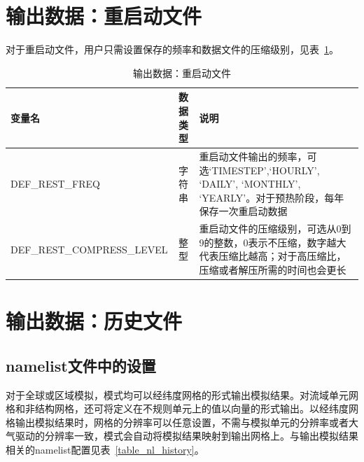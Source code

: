 \documentclass[a4paper,12pt,twoside]{article}
\begin{document}
\section{输出数据：重启动文件}\label{restart}
对于重启动文件，用户只需设置保存的频率和数据文件的压缩级别，见表~\ref{table_nl_restart}。
\begin{table}[!htbp] \small
\caption{输出数据：重启动文件}\label{table_nl_restart}
\centering \renewcommand{\arraystretch}{1.2}
\begin{tabular}{lcp{}}
\toprule
\textbf{变量名} & \textbf{数据类型} & \textbf{说明} \\\midrule
DEF\_REST\_FREQ & 字符串 & 重启动文件输出的频率，可选`TIMESTEP',`HOURLY', `DAILY', `MONTHLY', `YEARLY'。对于预热阶段，每年保存一次重启动数据 \\
DEF\_REST\_COMPRESS\_LEVEL & 整型 & 重启动文件的压缩级别，可选从0到9的整数，0表示不压缩，数字越大代表压缩比越高；对于高压缩比，压缩或者解压所需的时间也会更长 \\
\bottomrule
\end{tabular} 
\end{table}

\section{输出数据：历史文件}\label{history}

\subsection{namelist文件中的设置}

对于全球或区域模拟，模式均可以经纬度网格的形式输出模拟结果。对流域单元网格和非结构网格，还可将定义在不规则单元上的值以向量的形式输出。以经纬度网格输出模拟结果时，网格的分辨率可以任意设置，不需与模拟单元的分辨率或者大气驱动的分辨率一致，模式会自动将模拟结果映射到输出网格上。与输出模拟结果相关的namelist配置见表~\ref{table_nl_history}。
\end{document}
